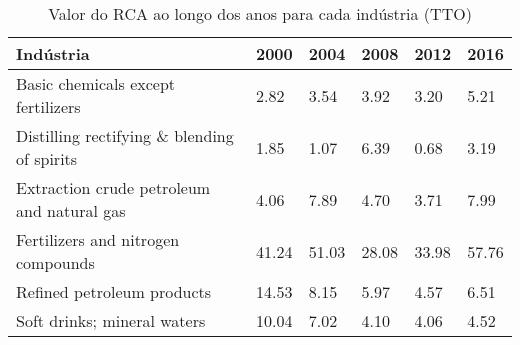 \begin{table}
\centering
\caption{Valor do RCA ao longo dos anos para cada indústria (TTO)}
\label{tab:ex3-tempo-TTO}
\begin{tabular}{p{6cm}p{1.5cm}p{1.5cm}p{1.5cm}p{1.5cm}p{1.5cm}}
\toprule
                                  Indústria &  2000 &  2004 &  2008 &  2012 &  2016 \\
\midrule
         Basic chemicals except fertilizers &  2.82 &  3.54 &  3.92 &  3.20 &  5.21 \\
Distilling rectifying \& blending of spirits &  1.85 &  1.07 &  6.39 &  0.68 &  3.19 \\
 Extraction crude petroleum and natural gas &  4.06 &  7.89 &  4.70 &  3.71 &  7.99 \\
         Fertilizers and nitrogen compounds & 41.24 & 51.03 & 28.08 & 33.98 & 57.76 \\
                 Refined petroleum products & 14.53 &  8.15 &  5.97 &  4.57 &  6.51 \\
                Soft drinks; mineral waters & 10.04 &  7.02 &  4.10 &  4.06 &  4.52 \\
\bottomrule
\end{tabular}
\end{table}
